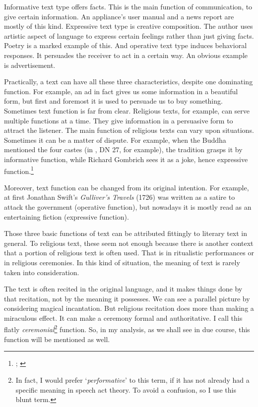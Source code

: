 Informative text type offers facts. This is the main function of communication, to give certain information. An appliance's user manual and a news report are mostly of this kind. Expressive text type is creative composition. The author uses artistic aspect of language to express certain feelings rather than just giving facts. Poetry is a marked example of this. And operative text type induces behavioral responses. It persuades the receiver to act in a certain way. An obvious example is advertisement.

Practically, a text can have all these three characteristics, despite one dominating function. For example, an ad in fact gives us some information in a beautiful form, but first and foremost it is used to persuade us to buy something. Sometimes text function is far from clear. Religious texts, for example, can serve multiple functions at a time. They give information in a persuasive form to attract the listener. The main function of religious texts can vary upon situations. Sometimes it can be a matter of dispute. For example, when the Buddha mentioned the four castes (in , DN 27, for example), the tradition grasps it by informative function, while Richard Gombrich sees it as a joke, hence expressive function.\footnote{\citealp[pp.~81--2]{gombrich:how}; \citealp[pp.~79--80]{gombrich:theravada}}

Moreover, text function can be changed from its original intention. For example, at first Jonathan Swift's \emph{Gulliver's Travels} (1726) was written as a satire to attack the government (operative function), but nowadays it is mostly read as an entertaining fiction (expressive function).

Those three basic functions of text can be attributed fittingly to literary text in general. To religious text, these seem not enough because there is another context that a portion of religious text is often used. That is in ritualistic performances or in religious ceremonies. In this kind of situation, the meaning of text is rarely taken into consideration. 

The text is often recited in the original language, and it makes things done by that recitation, not by the meaning it possesses. We can see a parallel picture by considering magical incantation. But religious recitation does more than making a miraculous effect. It can make a ceremony formal and authoritative. I call this flatly \emph{ceremonial}\footnote{In fact, I would prefer `\emph{performative}' to this term, if it has not already had a specific meaning in speech act theory. To avoid a confusion, so I use this blunt term.} function. So, in my analysis, as we shall see in due course, this function will be mentioned as well.


